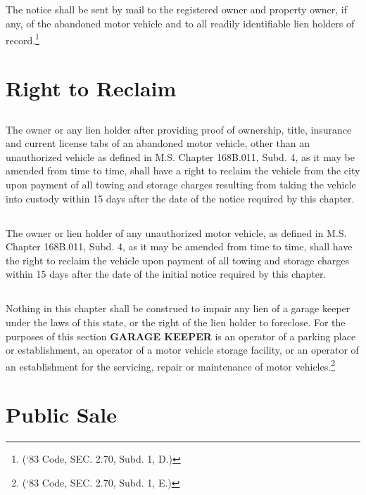 \subsection{}
The notice shall be sent by mail to the registered owner and property owner, if any, of the abandoned motor vehicle and to all readily identifiable lien holders of record.\footnote{(‘83 Code, SEC. 2.70, Subd. 1, D.)}

\section{Right to Reclaim}
\subsection{}
The owner or any lien holder after providing proof of ownership, title, insurance and current license tabs of an abandoned motor vehicle, other than an unauthorized vehicle as defined in M.S. Chapter 168B.011, Subd. 4, as it may be amended from time to time, shall have a right to reclaim the vehicle from the city upon payment of all towing and storage charges resulting from taking the vehicle into custody within 15 days after the date of the notice required by this chapter.
\subsection{}
The owner or lien holder of any unauthorized motor vehicle, as defined in M.S. Chapter 168B.011, Subd. 4, as it may be amended from time to time, shall have the right to reclaim the vehicle upon payment of all towing and storage charges within 15 days after the date of the initial notice required by this chapter.
\subsection{}
Nothing in this chapter shall be construed to impair any lien of a garage keeper under the laws of this state, or the right of the lien holder to foreclose.  For the purposes of this section \textbf{GARAGE KEEPER} is an operator of a parking place or establishment, an operator of a motor vehicle storage facility, or an operator of an establishment for the servicing, repair or maintenance of motor vehicles.\footnote{(‘83 Code, SEC. 2.70, Subd. 1, E.)}

\section{Public Sale}
